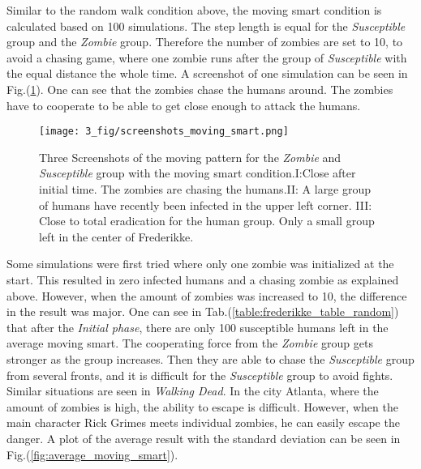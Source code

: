 \documentclass[%
twoside,                 %
final,                   %
chapterprefix=true,      %
open=right               %
10pt]{book}
\begin{document}
\vspace{3mm}




\vspace{3mm}


Similar to the random walk condition above, the moving smart condition is calculated based on 100 simulations. The step length is equal for the \emph{Susceptible} group and the \emph{Zombie} group. Therefore the number of zombies are set to 10, to avoid a chasing game, where one zombie runs after the group of \emph{Susceptible} with the equal distance the whole time. A screenshot of one simulation can be seen in Fig.(\ref{fig:screenshot_moving_smart}). One can see that the zombies chase the humans around. The zombies have to cooperate to be able to get close enough to attack the humans.  


\vspace{3mm}




\vspace{3mm}




\begin{figure}[ht]
  \centerline{\texttt{[image: 3\_fig/screenshots\_moving\_smart.png]}}
  \caption{
  \label{fig:screenshot_moving_smart} Three Screenshots of the moving pattern for the \emph{Zombie} and \emph{Susceptible} group with the moving smart condition.I:Close after initial time. The zombies are chasing the humans.II: A large group of humans have recently been infected in the upper left corner. III: Close to total eradication for the human group. Only a small group left in the center of Frederikke.
  }
\end{figure}


Some simulations were first tried where only one zombie was initialized at the start. This resulted in zero infected humans and a chasing zombie as explained above. However, when the amount of zombies was increased to 10, the difference in the result was major. One can see in Tab.(\ref{table:frederikke_table_random}) that after the \emph{Initial phase}, there are only 100 susceptible humans left in the average moving smart. The cooperating force from the \emph{Zombie} group gets stronger as the group increases. Then they are able to chase the \emph{Susceptible} group from several fronts, and it is difficult for the \emph{Susceptible} group to avoid fights. Similar situations are seen in \emph{Walking Dead}. In the city Atlanta, where the amount of zombies is high, the ability to escape is difficult. However, when the main character Rick Grimes meets individual zombies, he can easily escape the danger. A plot of the average result with the standard deviation can be seen in Fig.(\ref{fig:average_moving_smart}). 
\end{document}
